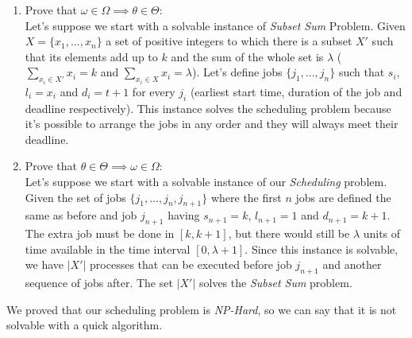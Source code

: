 \documentclass[11pt]{article}
\begin{document}
\begin{enumerate}
	\item Prove that $\omega \in \Omega \implies  \theta \in \Theta$: \\
	Let's suppose we start with a solvable instance of \textit{Subset Sum} Problem. Given $X = \{x_1, ..., x_n\}$ a set of positive integers to which there is a subset $X'$ such that its elements add up to $k$ and the sum of the whole set is $\lambda$ ($\sum\limits_{x_i \in X'}x_i = k$ and $\sum\limits_{x_i \in X}x_i = \lambda$). Let's define jobs $\{j_1, ..., j_n\}$ such that $s_i$, $l_i = x_i$ and $d_i = t+1$ for every $j_i$ (earliest start time, duration of the job and deadline respectively). This instance solves the scheduling problem because it's possible to arrange the jobs in any order and they will always meet their deadline.
		
	\item Prove that $\theta \in \Theta \implies  \omega \in \Omega$: \\
	Let's suppose we start with a solvable instance of our \textit{Scheduling} problem. Given the set of jobs $\{j_1, ..., j_n, j_{n+1}\}$ where the first $n$ jobs are defined the same as before and job $j_{n+1}$ having $s_{n+1} = k$, $l_{n+1} = 1$ and $d_{n+1} = k+1$. The extra job must be done in $[k, k+1]$, but there would still be $\lambda$ units of time available in the time interval $[0, \lambda+1]$. Since this instance is solvable, we have $|X'|$ processes that can be executed before job $j_{n+1}$ and another sequence of jobs after. The set $|X'|$ solves the \textit{Subset Sum} problem.
\end{enumerate}
We proved that our scheduling problem is \textit{NP-Hard}, so we can say that it is not solvable with a quick algorithm.
\end{document}
